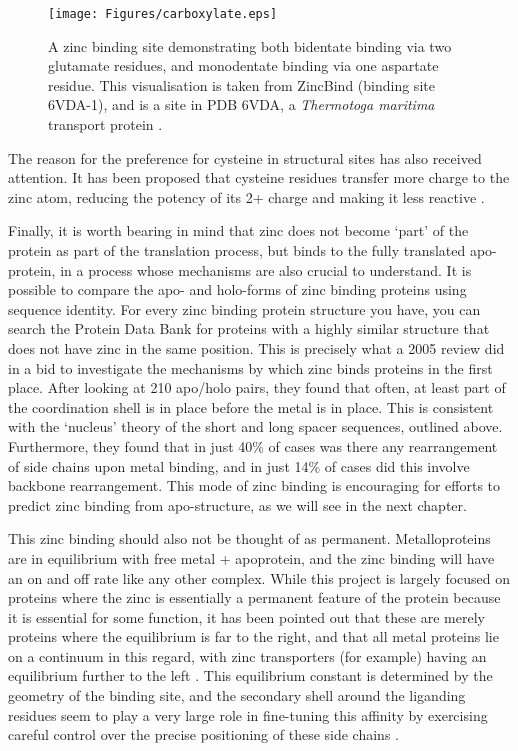\begin{figure}
\centering
\texttt{[image: Figures/carboxylate.eps]}
\caption[Monodentate and bidentate binding]{\label{fig:carboxylate} A zinc binding site demonstrating both bidentate binding via two glutamate residues, and monodentate binding via one aspartate residue. This visualisation is taken from ZincBind (binding site 6VDA-1), and is a site in PDB 6VDA, a \emph{Thermotoga maritima} transport protein \cite{udagedara2020pdb}.}
\end{figure}


The reason for the preference for cysteine in structural sites has also received attention. It has been proposed that cysteine residues transfer more charge to the zinc atom, reducing the potency of its 2+ charge and making it less reactive \cite{lee2008physical}. 

Finally, it is worth bearing in mind that zinc does not become `part' of the protein as part of the translation process, but binds to the fully translated apo-protein, in a process whose mechanisms are also crucial to understand. It is possible to compare the apo- and holo-forms of zinc binding proteins using sequence identity. For every zinc binding protein structure you have, you can search the Protein Data Bank for proteins with a highly similar structure that does not have zinc in the same position. This is precisely what a 2005 review did \cite{babor2005flexibility} in a bid to investigate the mechanisms by which zinc binds proteins in the first place. After looking at 210 apo/holo pairs, they found that often, at least part of the coordination shell is in place before the metal is in place. This is consistent with the `nucleus' theory of the short and long spacer sequences, outlined above. Furthermore, they found that in just 40\% of cases was there any rearrangement of side chains upon metal binding, and in just 14\% of cases did this involve backbone rearrangement. This mode of zinc binding is encouraging for efforts to predict zinc binding from apo-structure, as we will see in the next chapter.

This zinc binding should also not be thought of as permanent. Metalloproteins are in equilibrium with free metal + apoprotein, and the zinc binding will have an on and off rate like any other complex. While this project is largely focused on proteins where the zinc is essentially a permanent feature of the protein because it is essential for some function, it has been pointed out that these are merely proteins where the equilibrium is far to the right, and that all metal proteins lie on a continuum in this regard, with zinc transporters (for example) having an equilibrium further to the left \cite{maret2010metalloproteomics}. This equilibrium constant is determined by the geometry of the binding site, and the secondary shell around the liganding residues seem to play a very large role in fine-tuning this affinity by exercising careful control over the precise positioning of these side chains \cite{kochanczyk2015relationship}.

